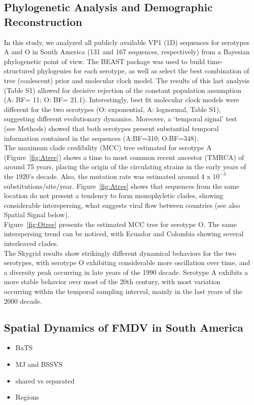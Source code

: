 \documentclass[10pt]{article}
\begin{document}
\subsection*{Phylogenetic Analysis and Demographic Reconstruction}
\indent In this study, we analyzed all publicly available VP1 (1D) sequences for serotypes A and O in South America (131 and 167 sequences, respectively) from a Bayesian phylogenetic point of view. The BEAST \cite{BEAST} package was used to build time-structured phylogenies for each serotype, as well as select the best combination of tree (coalescent) prior and molecular clock model. The results of this last analysis (Table S1) allowed for decisive rejection of the constant population assumption (A: BF= 11; O: BF= 21.1). Interestingly, best fit molecular clock models were different for the two serotypes (O: exponential, A: lognormal, Table S1), suggesting different evolutionary dynamics. Moreover, a `temporal signal' test (see Methods) showed that both serotypes present substantial temporal information contained in the sequences (A:BF=310; O:BF=348).\\
\indent The maximum clade credibility (MCC) tree estimated for serotype A (Figure~\ref{fig:Atree}) shows a time to most common recent ancestor (TMRCA) of around 75 years, placing the origin of the circulating strains in the early years of the 1920's decade. Also, the mutation rate was estimated around $4$ x $10^{-3}$ substitutions/site/year. Figure~\ref{fig:Atree} shows that sequences from the same location do not present a tendency to form monophyletic clades, showing considerable interspersing, what suggests viral flow between countries (see also Spatial Signal below).\\
\indent Figure~\ref{fig:Otree} presents the estimated MCC tree for serotype O. The same interspersing trend can be noticed, with Ecuador and Colombia showing several interleaved clades. \\
\indent The Skygrid results show strikingly different dynamical behaviors for the two serotypes, with serotype O exhibiting considerable more oscillation over time, and a diversity peak occurring in late years of the 1990 decade. Serotype A exhibits a more stable behavior over most of the 20th century, with most variation occurring within the temporal sampling interval, mainly in the last years of the 2000 decade.\\
\subsection*{Spatial Dynamics of FMDV in South America}
\begin{itemize}
 \item BaTS
 \item MJ and BSSVS
 \item shared vs separated
 \item Regions
\end{itemize}
\end{document}
